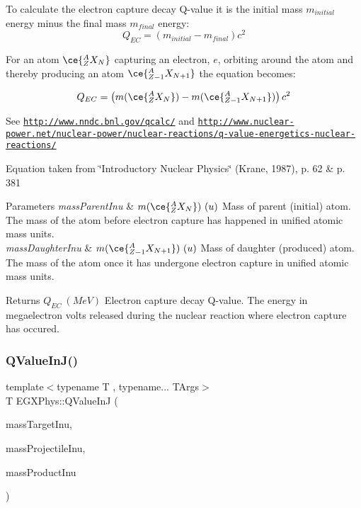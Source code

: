 To calculate the electron capture decay Q-\/value it is the initial mass $m_{initial}$ energy minus the final mass $m_{final}$ energy\+: \[Q_{EC} = \left ( m_{initial}-m_{final}\right ) c^2\]

For an atom $\ce{ ^{A}_{Z}X_{N} }$ capturing an electron, $e$, orbiting around the atom and thereby producing an atom $\ce{ ^{A}_{Z-1}X_{N{+1}} }$ the equation becomes\+:

\[Q_{EC} = \left ( m(\ce{ ^{A}_{Z}X_{N} }) - m(\ce{ ^{A}_{Z-1}X_{N{+1}} }) \right ) c^2\]

See \href{http://www.nndc.bnl.gov/qcalc/}{\tt http\+://www.\+nndc.\+bnl.\+gov/qcalc/} and \href{http://www.nuclear-power.net/nuclear-power/nuclear-reactions/q-value-energetics-nuclear-reactions/}{\tt http\+://www.\+nuclear-\/power.\+net/nuclear-\/power/nuclear-\/reactions/q-\/value-\/energetics-\/nuclear-\/reactions/}

Equation taken from \char`\"{}\+Introductory Nuclear Physics\char`\"{} (Krane, 1987), p. 62 \& p. 381


\begin{DoxyParams}{Parameters}
{\em mass\+Parent\+Inu} & $m(\ce{ ^{A}_{Z}X_{N} })\ (u)$ Mass of parent (initial) atom. The mass of the atom before electron capture has happened in unified atomic mass units. \\
\hline
{\em mass\+Daughter\+Inu} & $m(\ce{ ^{A}_{Z-1}X_{N{+1}} })\ (u)$ Mass of daughter (produced) atom. The mass of the atom once it has undergone electron capture in unified atomic mass units. \\
\hline
\end{DoxyParams}
\begin{DoxyReturn}{Returns}
$Q_{EC}\ (MeV)$ Electron capture decay Q-\/value. The energy in megaelectron volts released during the nuclear reaction where electron capture has occured. 
\end{DoxyReturn}
\mbox{\label{group___e_g_x_phys-_q_value_ga377e1e8298a32359ac68025fb1dd8151}} 
\subsubsection{\texorpdfstring{Q\+Value\+In\+J()}{QValueInJ()}}
{\footnotesize\ttfamily template$<$typename T , typename... T\+Args$>$ \\
T E\+G\+X\+Phys\+::\+Q\+Value\+InJ (\begin{DoxyParamCaption}\item[{const T \&}]{mass\+Target\+Inu,  }\item[{const T \&}]{mass\+Projectile\+Inu,  }\item[{const T\+Args \&...}]{mass\+Product\+Inu }\end{DoxyParamCaption})}



